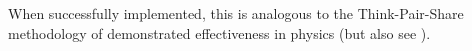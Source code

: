 \begin{itemize}
\end{itemize} 

When successfully implemented, this is analogous to the Think-Pair-Share methodology \cite{lyman1981responsive} of demonstrated effectiveness in physics \cite{rahman2025impact, gok2018evaluation} (but also see \cite{cooper2021reconsidering}).

